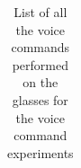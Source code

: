 \begin{table}[H]
\begin{tabular}{|l|l|}
                                        
    \end{tabular}
    \caption{List of all the voice commands performed on the glasses for the voice command experiments}
    \label{tab:voice_commands}
\end{table}


